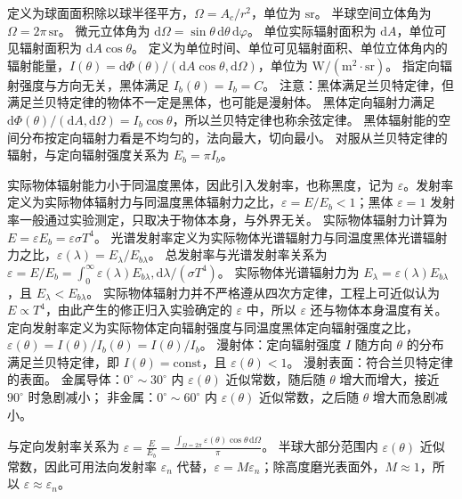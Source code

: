 定义为球面面积除以球半径平方，$\Omega=A_c/r^2$，单位为 $\mathrm{sr}$。
半球空间立体角为 $\Omega=2\pi\,\mathrm{sr}$。
微元立体角为 $\mathrm{d}\Omega=\sin\theta\,\mathrm{d}\theta\,\mathrm{d}\varphi$。
单位实际辐射面积为 $\mathrm{d}A$，单位可见辐射面积为 $\mathrm{d}A\cos\theta$。
定义为单位时间、单位可见辐射面积、单位立体角内的辐射能量，$I(\theta)=\mathrm{d}\Phi(\theta)/(\mathrm{d}A\cos\theta,\mathrm{d}\Omega)$，单位为 $\mathrm{W}/(\mathrm{m}^2\cdot\mathrm{sr})$。
指定向辐射强度与方向无关，黑体满足 $I_b(\theta)=I_b=C$。
注意：黑体满足兰贝特定律，但满足兰贝特定律的物体不一定是黑体，也可能是漫射体。
黑体定向辐射力满足 $\mathrm{d}\Phi(\theta)/(\mathrm{d}A,\mathrm{d}\Omega)=I_b\cos\theta$，所以兰贝特定律也称余弦定律。
黑体辐射能的空间分布按定向辐射力看是不均匀的，法向最大，切向最小。
对服从兰贝特定律的辐射，与定向辐射强度关系为 $E_b=\pi I_b$。

\divider

实际物体辐射能力小于同温度黑体，因此引入发射率，也称黑度，记为 $\varepsilon$。发射率定义为实际物体辐射力与同温度黑体辐射力之比，$\varepsilon=E/E_b<1$；黑体 $\varepsilon=1$
发射率一般通过实验测定，只取决于物体本身，与外界无关。
实际物体辐射力计算为 $E=\varepsilon E_b=\varepsilon\sigma T^4$。
光谱发射率定义为实际物体光谱辐射力与同温度黑体光谱辐射力之比，$\varepsilon(\lambda)=E_\lambda/E_{b\lambda}$。
总发射率与光谱发射率关系为 $\varepsilon=E/E_b=\int_0^\infty \varepsilon(\lambda)E_{b\lambda},\mathrm{d}\lambda/(\sigma T^4)$。
实际物体光谱辐射力为 $E_\lambda=\varepsilon(\lambda)E_{b\lambda}$，且 $E_\lambda<E_{b\lambda}$。
实际物体辐射力并不严格遵从四次方定律，工程上可近似认为 $E\propto T^4$，由此产生的修正归入实验确定的 $\varepsilon$ 中，所以 $\varepsilon$ 还与物体本身温度有关。
定向发射率定义为实际物体定向辐射强度与同温度黑体定向辐射强度之比，$\varepsilon(\theta)=I(\theta)/I_b(\theta)=I(\theta)/I_b$。
漫射体：定向辐射强度 $I$ 随方向 $\theta$ 的分布满足兰贝特定律，即 $I(\theta)=\mathrm{const}$，且 $\varepsilon(\theta)<1$。
漫射表面：符合兰贝特定律的表面。
金属导体：$0^\circ\sim30^\circ$ 内 $\varepsilon(\theta)$ 近似常数，随后随 $\theta$ 增大而增大，接近 $90^\circ$ 时急剧减小；
非金属：$0^\circ\sim60^\circ$ 内 $\varepsilon(\theta)$ 近似常数，之后随 $\theta$ 增大而急剧减小。

与定向发射率关系为 $\varepsilon=\frac{E}{E_b}=\frac{\int_{\Omega=2\pi}\varepsilon(\theta)\cos\theta\,\mathrm{d}\Omega}{\pi}$。
半球大部分范围内 $\varepsilon(\theta)$ 近似常数，因此可用法向发射率 $\varepsilon_n$ 代替，$\varepsilon=M\varepsilon_n$；除高度磨光表面外，$M\approx1$，所以 $\varepsilon\approx\varepsilon_n$。

